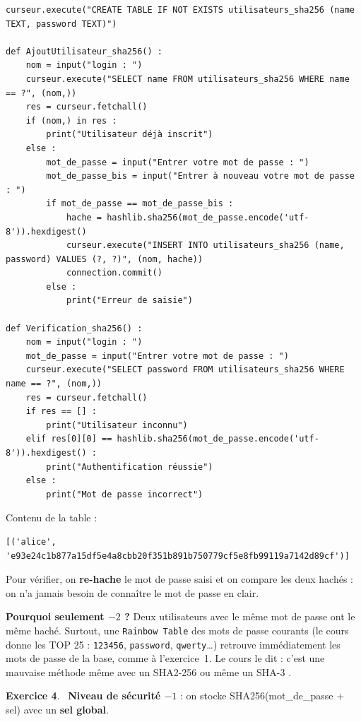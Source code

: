\documentclass[11pt,a4paper]{article}
\newcommand{\code}[1]{\colorbox{fondcode}{\ttfamily\small #1}}
\newcommand{\exo}[1]{\par\medskip\textbf{Exercice #1}.\ }
\begin{document}
\begin{lstlisting}
curseur.execute("CREATE TABLE IF NOT EXISTS utilisateurs_sha256 (name TEXT, password TEXT)")

def AjoutUtilisateur_sha256() :
    nom = input("login : ")
    curseur.execute("SELECT name FROM utilisateurs_sha256 WHERE name == ?", (nom,))
    res = curseur.fetchall()
    if (nom,) in res :
        print("Utilisateur déjà inscrit")
    else :
        mot_de_passe = input("Entrer votre mot de passe : ")
        mot_de_passe_bis = input("Entrer à nouveau votre mot de passe : ")
        if mot_de_passe == mot_de_passe_bis :
            hache = hashlib.sha256(mot_de_passe.encode('utf-8')).hexdigest()
            curseur.execute("INSERT INTO utilisateurs_sha256 (name, password) VALUES (?, ?)", (nom, hache))
            connection.commit()
        else :
            print("Erreur de saisie")

def Verification_sha256() :
    nom = input("login : ")
    mot_de_passe = input("Entrer votre mot de passe : ")
    curseur.execute("SELECT password FROM utilisateurs_sha256 WHERE name == ?", (nom,))
    res = curseur.fetchall()
    if res == [] :
        print("Utilisateur inconnu")
    elif res[0][0] == hashlib.sha256(mot_de_passe.encode('utf-8')).hexdigest() :
        print("Authentification réussie")
    else :
        print("Mot de passe incorrect")
\end{lstlisting}

Contenu de la table :
\begin{lstlisting}[style=sortie]
[('alice', 'e93e24c1b877a15df5e4a8cbb20f351b891b750779cf5e8fb99119a7142d89cf')]
\end{lstlisting}

Pour vérifier, on \textbf{re-hache} le mot de passe saisi et on compare les deux hachés : on n'a jamais besoin de connaître le mot de passe en clair.

\textbf{Pourquoi seulement $-2$ ?} Deux utilisateurs avec le même mot de passe ont le même haché. Surtout, une \texttt{Rainbow Table} des mots de passe courants (le cours donne les TOP 25 : \texttt{123456}, \texttt{password}, \texttt{qwerty}\dots) retrouve immédiatement les mots de passe de la base, comme à l'exercice~1. Le cours le dit : c'est une \og mauvaise méthode même avec un SHA2-256 ou même un SHA-3 \fg{}.

\exo{4} \textbf{Niveau de sécurité $-1$} : on stocke \code{SHA256(mot\_de\_passe + sel)} avec un \textbf{sel global}.
\end{document}

